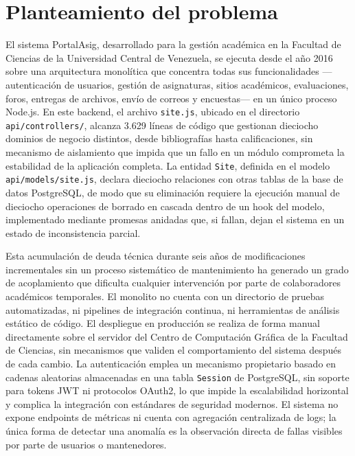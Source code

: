 \chapter{Planteamiento del problema}
\pagestyle{fancy}

El sistema PortalAsig, desarrollado para la gesti\'{o}n acad\'{e}mica en la Facultad
de Ciencias de la Universidad Central de Venezuela, se ejecuta desde el a\~{n}o
2016 sobre una arquitectura monol\'{i}tica que concentra todas sus funcionalidades
---autenticaci\'{o}n de usuarios, gesti\'{o}n de asignaturas, sitios acad\'{e}micos,
evaluaciones, foros, entregas de archivos, env\'{i}o de correos y encuestas--- en un
\'{u}nico proceso Node.js. En este backend, el archivo \texttt{site.js}, ubicado en el
directorio \texttt{api/controllers/}, alcanza 3.629 l\'{i}neas de c\'{o}digo que gestionan
dieciocho dominios de negocio distintos, desde bibliograf\'{i}as hasta calificaciones,
sin mecanismo de aislamiento que impida que un fallo en un m\'{o}dulo comprometa la
estabilidad de la aplicaci\'{o}n completa. La entidad \texttt{Site}, definida en el modelo
\texttt{api/models/site.js}, declara dieciocho relaciones con otras tablas de la base de
datos PostgreSQL, de modo que su eliminaci\'{o}n requiere la ejecuci\'{o}n manual de
dieciocho operaciones de borrado en cascada dentro de un hook del modelo,
implementado mediante promesas anidadas que, si fallan, dejan el sistema en un
estado de inconsistencia parcial.

Esta acumulaci\'{o}n de deuda t\'{e}cnica durante seis a\~{n}os de modificaciones
incrementales sin un proceso sistem\'{a}tico de mantenimiento ha generado un grado
de acoplamiento que dificulta cualquier intervenci\'{o}n por parte de colaboradores
acad\'{e}micos temporales. El monolito no cuenta con un directorio de pruebas
automatizadas, ni pipelines de integraci\'{o}n continua, ni herramientas de an\'{a}lisis
est\'{a}tico de c\'{o}digo. El despliegue en producci\'{o}n se realiza de forma manual
directamente sobre el servidor del Centro de Computaci\'{o}n Gr\'{a}fica de la Facultad de Ciencias,
sin mecanismos que validen el comportamiento del sistema despu\'{e}s de cada cambio.
La autenticaci\'{o}n emplea un mecanismo propietario basado en cadenas aleatorias
almacenadas en una tabla \texttt{Session} de PostgreSQL, sin soporte para tokens JWT ni
protocolos OAuth2, lo que impide la escalabilidad horizontal y complica la
integraci\'{o}n con est\'{a}ndares de seguridad modernos. El sistema no expone endpoints
de m\'{e}tricas ni cuenta con agregaci\'{o}n centralizada de logs; la \'{u}nica forma de
detectar una anomal\'{i}a es la observaci\'{o}n directa de fallas visibles por parte de
usuarios o mantenedores.

